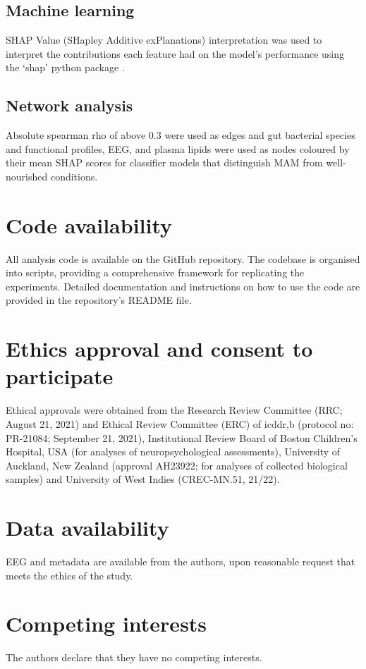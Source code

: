 \documentclass{article}
\begin{document}
\subsection*{Machine learning}
SHAP Value (SHapley Additive exPlanations) interpretation was used to interpret the contributions each feature had on the model's performance using the ‘shap’ python package \cite{lundberg2017unified}.

\subsection*{Network analysis}
Absolute spearman rho of above 0.3 were used as edges and gut bacterial species and functional profiles, EEG, and plasma lipids were used as nodes coloured by their mean SHAP scores for classifier models that distinguish MAM from well-nourished conditions.

\section*{Code availability}
All analysis code is available on the GitHub repository.
The codebase is organised into scripts, providing a comprehensive framework for replicating the experiments.
Detailed documentation and instructions on how to use the code are provided in the repository's README file.

\section*{Ethics approval and consent to participate}
Ethical approvals were obtained from the Research Review Committee (RRC; August 21, 2021) and Ethical Review Committee (ERC) of icddr,b (protocol no: PR-21084; September 21, 2021), Institutional Review Board of Boston Children’s Hospital, USA (for analyses of neuropsychological assessments), University of Auckland, New Zealand (approval AH23922; for analyses of collected biological samples) and University of West Indies (CREC-MN.51, 21/22).

\section*{Data availability}
EEG and metadata are available from the authors, upon reasonable request that meets the ethics of the study.

\section*{Competing interests}
The authors declare that they have no competing interests.
\end{document}
